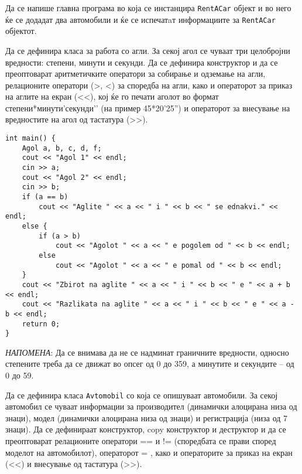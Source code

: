 \documentclass[12pt,a4paper]{exam}
\begin{document}
\begin{questions}
Да се напише главна програма во која се
инстанцира \texttt{RentACar} објект и во него ќе се додадат два автомобили и ќе се
испечатaт информациите за \texttt{RentACar} објектот.

\question
Да се дефинира класа за работа со агли. За секој агол се чуваат три целобројни
вредности: степени, минути и секунди. Да се дефинира конструктор и да се
преоптоварат аритметичките оператори за собирање и одземање на агли, релационите
оператори (>, <) за споредба на агли, како и операторот за приказ на аглите на
екран (<<), кој ќе го печати аголот во формат степени*минути’секунди’’ (на
пример 45*20'25'') и операторот за внесување на вредностите на агол од тастатура (>>).
\begin{lstlisting}
int main() {
    Agol a, b, c, d, f;
    cout << "Agol 1" << endl;
    cin >> a;
    cout << "Agol 2" << endl;
    cin >> b;
    if (a == b)
        cout << "Aglite " << a << " i " << b << " se ednakvi." << endl;
    else {
        if (a > b)
            cout << "Agolot " << a << " e pogolem od " << b << endl;
        else
            cout << "Agolot " << a << " e pomal od " << b << endl;
    }
    cout << "Zbirot na aglite " << a << " i " << b << " e " << a + b << endl;
    cout << "Razlikata na aglite " << a << " i " << b << " e " << a - b << endl;
    return 0;
}
\end{lstlisting}
\emph{НАПОМЕНА}: Да се внимава да не се надминат граничните вредности, односно
степените треба да се движат во опсег од 0 до 359, а минутите и секундите – од 0 до 59.

\question
Да се дефинира класа \texttt{Avtomobil} со која се опишуваат автомобили. За секој
автомобил се чуваат информации за производител (динамички алоцирана низа од
знаци), модел (динамички алоцирана низа од знаци) и регистрација (низа од 7 знаци).
Да се дефинираат конструктор, copy конструктор и деструктор и да се преоптоварат
релационите оператори == и != (споредбата се прави според моделот на
автомобилот), операторот = , како и операторите за приказ на екран (<<) и внесување
од тастатура (>>).


\end{questions}
\end{document}
